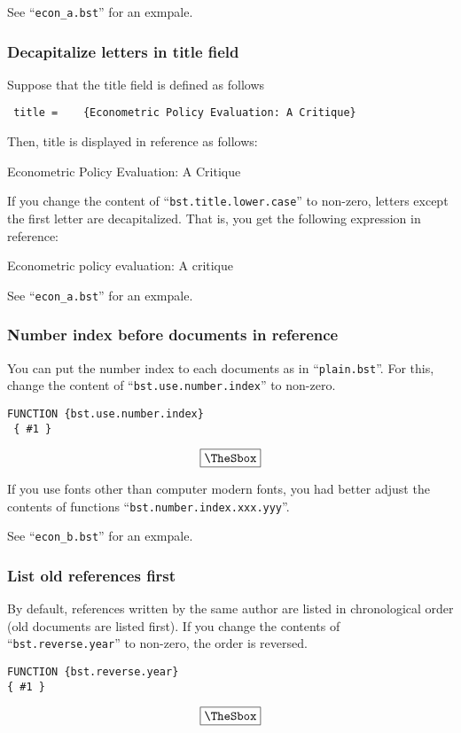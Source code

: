 \documentclass[10pt]{article}
\newenvironment{Frame}%
{\setlength{\fboxsep}{15pt}
\setlength{\mylength}{\linewidth}%
\addtolength{\mylength}{-2\fboxsep}%
\addtolength{\mylength}{-2\fboxrule}%
\Sbox
\minipage{\mylength}%
\setlength{\abovedisplayskip}{0pt}%
\setlength{\belowdisplayskip}{0pt}%
}%
{\endminipage\endSbox
\[\fbox{\TheSbox}\]}
\begin{document}
See ``\verb|econ_a.bst|'' for an exmpale.

\subsubsection{Decapitalize letters in title field}

Suppose that the title field is defined as follows
\begin{center}
  \verb| title =	{Econometric Policy Evaluation: A Critique}|
\end{center}

Then, title is displayed in reference as follows:
\begin{center}
 Econometric Policy Evaluation: A Critique
\end{center}

If you change the content of ``\texttt{bst.title.lower.case}'' to
non-zero, letters except the first letter are decapitalized.  That is,
you get the following expression in reference:
\begin{center}
 Econometric policy evaluation: A critique
\end{center}

See ``\verb|econ_a.bst|'' for an exmpale.


\subsubsection{Number index before documents in reference}

You can put the number index to each documents as in
``\texttt{plain.bst}''.  For this, change the content of
``\texttt{bst.use.number.index}'' to non-zero.
\begin{Frame}
\begin{verbatim}
FUNCTION {bst.use.number.index}
 { #1 }
\end{verbatim}
\end{Frame}

If you use fonts other than computer modern fonts, you had better adjust
the contents of functions ``\texttt{bst.number.index.xxx.yyy}''.

See ``\verb|econ_b.bst|'' for an exmpale.


\subsubsection{List old references first}

By default, references written by the same author are listed in
chronological order (old documents are listed first).  If you change the
contents of ``\texttt{bst.reverse.year}'' to non-zero, the order is
reversed.
\begin{Frame}
\begin{verbatim}
FUNCTION {bst.reverse.year}
{ #1 }
\end{verbatim}
\end{Frame}
\end{document}

